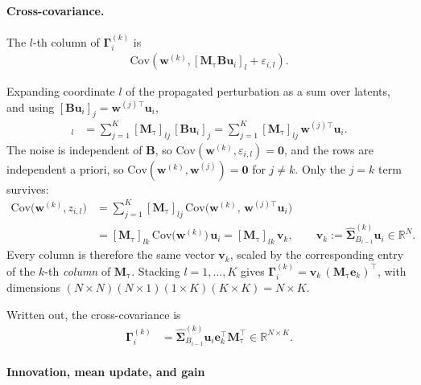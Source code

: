 \documentclass[11pt,letterpaper]{article} %
\begin{document}
\paragraph{Cross-covariance.}

The $l$-th column of $\bm{\Gamma}_i^{(k)}$ is
\begin{align*}
    \mathrm{Cov}
    \left(
        \bm{w}^{(k)},
        [\bm{M}_{\mathrm{\tau}}\bm{B}\bm{u}_i]_l
        +
        \varepsilon_{i,l}
    \right).
\end{align*}

Expanding coordinate $l$ of the propagated perturbation as a sum over latents, and using
$[\bm{B}\bm{u}_i]_j = \bm{w}^{(j)\top}\bm{u}_i$,
\begin{align*}
    [\bm{M}_{\mathrm{\tau}}\bm{B}\bm{u}_i]_l
    &= \sum_{j=1}^{K} [\bm{M}_{\mathrm{\tau}}]_{lj}\,[\bm{B}\bm{u}_i]_j
     = \sum_{j=1}^{K} [\bm{M}_{\mathrm{\tau}}]_{lj}\,\bm{w}^{(j)\top}\bm{u}_i.
\end{align*}
The noise is independent of $\bm{B}$, so $\mathrm{Cov}(\bm{w}^{(k)},\varepsilon_{i,l}) = \bm{0}$, and
the rows are independent a priori, so $\mathrm{Cov}(\bm{w}^{(k)},\bm{w}^{(j)}) = \bm{0}$ for
$j \neq k$. Only the $j=k$ term survives:
\begin{align*}
    \mathrm{Cov}\big(\bm{w}^{(k)}, z_{i,l}\big)
    &= \sum_{j=1}^{K} [\bm{M}_{\mathrm{\tau}}]_{lj}\,
       \mathrm{Cov}\big(\bm{w}^{(k)},\, \bm{w}^{(j)\top}\bm{u}_i\big) \\
    &= [\bm{M}_{\mathrm{\tau}}]_{lk}\,\mathrm{Cov}\big(\bm{w}^{(k)}\big)\,\bm{u}_i
     = [\bm{M}_{\mathrm{\tau}}]_{lk}\,\bm{v}_k,
    \qquad
    \bm{v}_k := \hat{\bm{\Sigma}}_{B_{i-1}}^{(k)}\bm{u}_i \in \mathbb{R}^{N}.
\end{align*}
Every column is therefore the same vector $\bm{v}_k$, scaled by the corresponding entry of the
$k$-th \emph{column} of $\bm{M}_{\mathrm{\tau}}$. Stacking $l = 1,\dots,K$ gives
$\bm{\Gamma}_i^{(k)} = \bm{v}_k\,(\bm{M}_{\mathrm{\tau}}\bm{e}_k)^\top$, with dimensions
$(N\times N)(N\times 1)(1\times K)(K\times K) = N\times K$.

Written out, the cross-covariance is
\begin{align*}
    \bm{\Gamma}_i^{(k)}
    &=
    \hat{\bm{\Sigma}}_{B_{i-1}}^{(k)}
    \bm{u}_i
    \bm{e}_k^\top
    \bm{M}_{\mathrm{\tau}}^\top
    \in\mathbb{R}^{N\times K}.
\end{align*}


\paragraph{Innovation, mean update, and gain}
\end{document}
